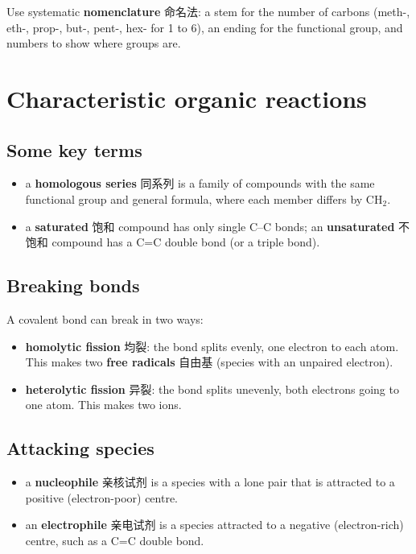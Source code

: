 \documentclass[11pt]{article}
\begin{document}
Use systematic \textbf{nomenclature} 命名法: a stem for the number of carbons (meth-, eth-, prop-, but-, pent-, hex- for 1 to 6), an ending for the functional group, and numbers to show where groups are.

\section*{Characteristic organic reactions}

\subsection*{Some key terms}

\begin{itemize}
\item a \textbf{homologous series} 同系列 is a family of compounds with the same functional group and general formula, where each member differs by $\text{CH}_2$.

\item a \textbf{saturated} 饱和 compound has only single C–C bonds; an \textbf{unsaturated} 不饱和 compound has a C=C double bond (or a triple bond).

\end{itemize}

\subsection*{Breaking bonds}

A covalent bond can break in two ways:

\begin{itemize}
\item \textbf{homolytic fission} 均裂: the bond splits evenly, one electron to each atom. This makes two \textbf{free radicals} 自由基 (species with an unpaired electron).

\item \textbf{heterolytic fission} 异裂: the bond splits unevenly, both electrons going to one atom. This makes two ions.

\end{itemize}

\subsection*{Attacking species}

\begin{itemize}
\item a \textbf{nucleophile} 亲核试剂 is a species with a lone pair that is attracted to a positive (electron-poor) centre.

\item an \textbf{electrophile} 亲电试剂 is a species attracted to a negative (electron-rich) centre, such as a C=C double bond.

\end{itemize}
\end{document}
